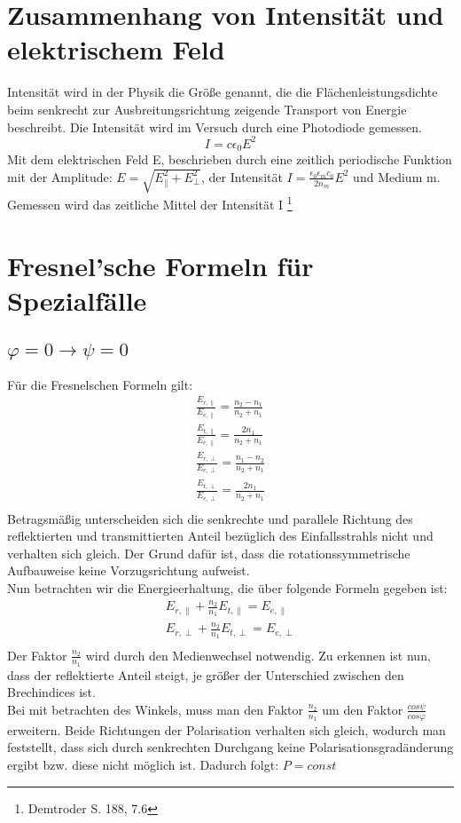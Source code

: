 \section{Zusammenhang von Intensität und elektrischem Feld}
Intensität wird in der Physik die Größe genannt, die die Flächenleistungsdichte beim senkrecht zur Ausbreitungsrichtung zeigende Transport von Energie beschreibt. 
Die Intensität wird im Versuch durch eine Photodiode gemessen. 
\begin{equation}
I=c\epsilon_0 E^2
\end{equation}
Mit dem elektrischen Feld E, beschrieben durch eine zeitlich periodische Funktion mit der Amplitude: $E=\sqrt{E_{\parallel}^2 +E^2_{\perp}}$, der Intensität $I=\frac{\epsilon_0\epsilon_mc_0}{2n_m}E^2$ und Medium m.
Gemessen wird das zeitliche Mittel der Intensität I
\footnote{Demtroder S. 188, 7.6}



\section{Fresnel'sche Formeln für  Spezialfälle }
\subsection*{$\varphi=0\rightarrow\psi=0$}
Für die Fresnelschen Formeln gilt:
\begin{align*}
\frac{E_{r,\parallel}}{E_{e,\parallel}}=\frac{n_2-n_1}{n_2+n_1}\\
\frac{E_{t,\parallel}}{E_{e,\parallel}}=\frac{2n_1}{n_2+n_1}\\
\frac{E_{r,\perp}}{E_{e,\perp}}=\frac{n_1-n_2}{n_2+n_1}\\
\frac{E_{t,\perp}}{E_{e,\perp}}=\frac{2n_1}{n_2+n_1}\\
\end{align*}
Betragsmäßig unterscheiden sich die senkrechte und parallele Richtung des reflektierten und transmittierten Anteil bezüglich des Einfallsstrahls nicht und verhalten sich gleich. Der Grund dafür ist, dass die rotationssymmetrische Aufbauweise keine Vorzugsrichtung aufweist. \\
Nun betrachten wir die Energieerhaltung, die über folgende Formeln gegeben ist:
\begin{align*}
E_{r,\parallel}+\frac{n_2}{n_1}E_{t,\parallel}=E_{e,\parallel}\\
E_{r,\perp}+\frac{n_2}{n_1}E_{t,\perp}=E_{e,\perp}\\
\end{align*}
Der Faktor $\frac{n_2}{n_1}$ wird durch den Medienwechsel notwendig. Zu erkennen ist nun, dass der reflektierte Anteil steigt, je größer der Unterschied zwischen den Brechindices ist. \\
Bei mit betrachten des Winkels, muss man den Faktor $\frac{n_2}{n_1}$  um den Faktor $\frac{cos\psi}{cos\varphi}$ erweitern. 
Beide Richtungen der Polarisation verhalten sich gleich, wodurch man feststellt, dass sich durch senkrechten Durchgang keine Polarisationsgradänderung ergibt bzw. diese nicht möglich ist. Dadurch folgt: $P=const$

